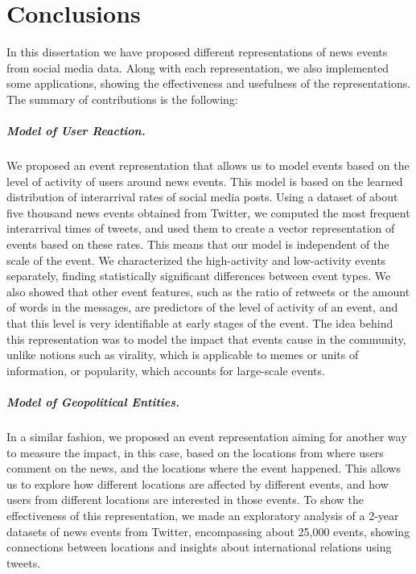 \chapter{Conclusions}

In this dissertation we have proposed different representations of news events
from social media data.
%
Along with each representation, we also implemented some applications, showing
the effectiveness and usefulness of the representations.
%
The summary of contributions is the following:

\paragraph{Model of User Reaction.}
%
We proposed an event representation that allows us to model events based on the
level of activity of users around news events. 
%
This model is based on the learned distribution of interarrival rates of social
media posts.
%
Using a dataset of about five thousand news events obtained from Twitter, we
computed the most frequent interarrival times of tweets, and used them to create
a vector representation of events based on these rates.
%
This means that our model is independent of the scale of the event.
%
We characterized the high-activity and low-activity events separately, finding
statistically significant differences between event types.
%
We also showed that other event features, such as the ratio of retweets or the
amount of words in the messages, are predictors of the level of activity of an
event, and that this level is very identifiable at early stages of the event.
%
The idea behind this representation was to model the impact that events cause in
the community, unlike notions such as virality, which is applicable to memes or
units of information, or popularity, which accounts for large-scale events.

\paragraph{Model of Geopolitical Entities.}
%
In a similar fashion, we proposed an event representation aiming for another way
to measure the impact, in this case, based on the locations from where users
comment on the news, and the locations where the event happened.
%
This allows us to explore how different locations are affected by different
events, and how users from different locations are interested in those events.
%
To show the effectiveness of this representation, we made an exploratory
analysis of a 2-year datasets of news events from Twitter, encompassing about
25,000 events, showing connections between locations and insights about
international relations using tweets.

